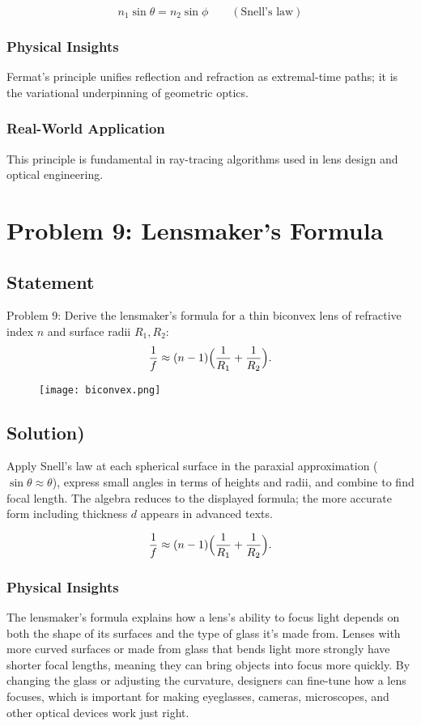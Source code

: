 \documentclass[12pt,a4paper]{article}
\newcommand{\bluebox}[1]{\begin{tcolorbox}#1\end{tcolorbox}}
\begin{document}
\bluebox{\[
n_1\sin\theta=n_2\sin\phi\qquad(\text{Snell's law})
\]}

\subsubsection*{Physical Insights}
Fermat's principle unifies reflection and refraction as extremal-time paths; it is the variational underpinning of geometric optics.

\subsubsection*{Real-World Application}
This principle is fundamental in ray-tracing algorithms used in lens design and optical engineering.

\newpage

\section{Problem 9: Lensmaker's Formula}
\subsection*{Statement }
Problem 9: Derive the lensmaker's formula for a thin biconvex lens of refractive index $n$ and surface radii $R_1,R_2$:
\[
\frac{1}{f}\approx (n-1)\Bigl(\frac{1}{R_1}+\frac{1}{R_2}\Bigr).
\]
\begin{figure}
  \texttt{[image: biconvex.png]}
\end{figure}
\subsection*{Solution)}
Apply Snell's law at each spherical surface in the paraxial approximation ($\sin\theta\approx\theta$), express small angles in terms of heights and radii, and combine to find focal length. The algebra reduces to the displayed formula; the more accurate form including thickness $d$ appears in advanced texts.

\bluebox{\[
\frac{1}{f}\approx (n-1)\Bigl(\frac{1}{R_1}+\frac{1}{R_2}\Bigr).
\]}

\subsubsection*{Physical Insights}
The lensmaker’s formula explains how a lens’s ability to focus light depends on both the shape of its surfaces and the type of glass it’s made from. Lenses with more curved surfaces or made from glass that bends light more strongly have shorter focal lengths, meaning they can bring objects into focus more quickly. By changing the glass or adjusting the curvature, designers can fine-tune how a lens focuses, which is important for making eyeglasses, cameras, microscopes, and other optical devices work just right.
\end{document}
